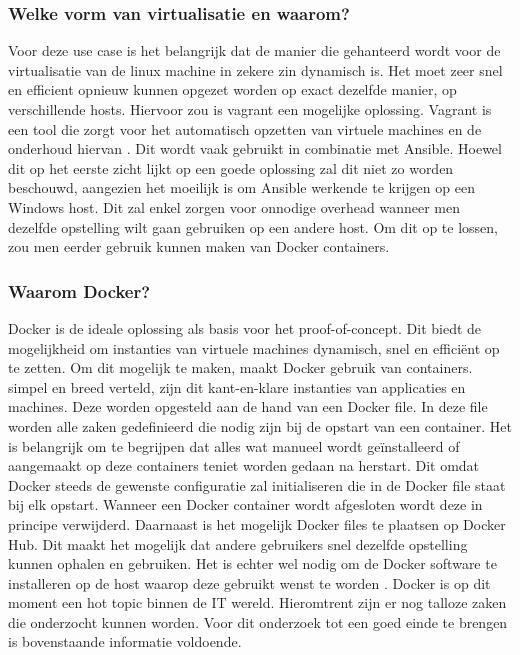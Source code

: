 \subsubsection{Welke vorm van virtualisatie en waarom?}
Voor deze use case is het belangrijk dat de manier die gehanteerd wordt voor de virtualisatie van de linux machine in zekere zin dynamisch is. Het moet zeer snel en efficient opnieuw kunnen opgezet worden op exact dezelfde manier, op verschillende hosts. Hiervoor zou is vagrant een mogelijke oplossing. Vagrant is een tool die zorgt voor het automatisch opzetten van virtuele machines en de onderhoud hiervan \autocite{samandal2021}.  Dit wordt vaak gebruikt in combinatie met Ansible. Hoewel dit op het eerste zicht lijkt op een goede oplossing zal dit niet zo worden beschouwd, aangezien het moeilijk is om Ansible werkende te krijgen op een Windows host. Dit zal enkel zorgen voor onnodige overhead wanneer men dezelfde opstelling wilt gaan gebruiken op een andere host. Om dit op te lossen, zou men eerder gebruik kunnen maken van Docker containers.

\subsubsection{Waarom Docker?}
Docker is de ideale oplossing als basis voor het proof-of-concept. Dit biedt de mogelijkheid om instanties van virtuele machines dynamisch, snel en efficiënt op te zetten. Om dit mogelijk te maken, maakt Docker gebruik van containers. simpel en breed verteld, zijn dit kant-en-klare instanties van applicaties en machines. Deze worden opgesteld aan de hand van een Docker file. In deze file worden alle zaken gedefinieerd die nodig zijn bij de opstart van een container. Het is belangrijk om te begrijpen dat alles wat manueel wordt geïnstalleerd of aangemaakt op deze containers teniet worden gedaan na herstart. Dit omdat Docker steeds de gewenste configuratie zal initialiseren die in de Docker file staat bij elk opstart. Wanneer een Docker container wordt afgesloten wordt deze in principe verwijderd. Daarnaast is het mogelijk  Docker files te plaatsen op Docker Hub. Dit maakt het mogelijk dat andere gebruikers snel dezelfde opstelling kunnen ophalen en gebruiken. Het is echter wel nodig om de Docker software te installeren op de host waarop deze gebruikt wenst te worden \autocite{Docker}. Docker is op dit moment een hot topic binnen de IT wereld. Hieromtrent zijn er nog talloze zaken die onderzocht kunnen worden. Voor dit onderzoek tot een goed einde te brengen is bovenstaande informatie voldoende. 








